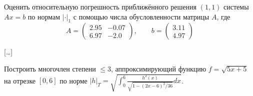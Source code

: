 \begin{problem}
    Оценить относительную погрешность приближённого решения $(1, 1)$ системы
    $Ax = b$ по нормам $|\cdot|_1$ с помощью числа обусловленности матрицы
    $A$, где
    \begin{equation*}
        A =
        \begin{pmatrix}
            2.95 & -0.07\\
            6.97 & -2.0
        \end{pmatrix}
        , \qquad b =
        \begin{pmatrix}
            3.11\\
            4.97
        \end{pmatrix}
    \end{equation*}
\end{problem}

[\ldots]


\begin{problem}
    Построить многочлен степени $\leq 3$, аппроксимирующий функцию
    $f = \sqrt{5x + 5}$ на отрезке $[0, 6]$ по норме
    $|h|_T = \sqrt{\int_0^6{
        \frac{h^2(x)}{\sqrt{1 - (2x - 6)^2/36}}
        dx
    }}$.
\end{problem}